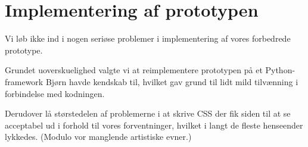 \section{Implementering af prototypen}

Vi løb ikke ind i nogen seriøse problemer i implementering af vores forbedrede prototype.

Grundet uoverskuelighed valgte vi at reimplementere prototypen på et Python-framework Bjørn havde kendskab til, hvilket gav grund til lidt mild tilvænning i forbindelse med kodningen.

Derudover lå størstedelen af problemerne i at skrive CSS der fik siden til at se acceptabel ud i forhold til vores forventninger, hvilket i langt de fleste henseender lykkedes. (Modulo vor manglende artistiske evner.)

